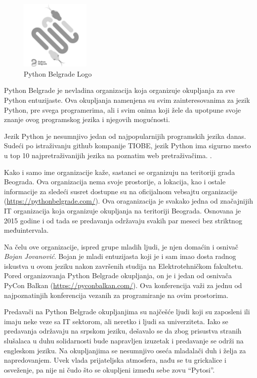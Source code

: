 \documentclass[a4paper]{article}
\begin{document}
{\begin{figure}[h!]
  \centering
  \includegraphics[width=0.3\textwidth]{pybgd.png}
  \caption{Python Belgrade Logo}
\end{figure}

Python Belgrade je nevladina organizacija koja organizuje okupljanja za sve Python entuzijaste. Ova okupljanja namenjena su svim
zainteresovanima za jezik Python, pre svega programerima, ali i svim onima koji žele da upotpune svoje znanje ovog programskog jezika i njegovih mogućnosti.

Jezik Python je nesumnjivo jedan od najpopularnijih programskih jezika danas. Sudeći po istraživanju github kompanije TIOBE, jezik Python ima sigurno mesto u top 10 najpretraživanijih jezika na poznatim web pretraživačima. \cite{pythonPopular}.

Kako i samo ime organizacije kaže, sastanci se organizuju na teritoriji grada Beograda. Ova organizacija nema svoje prostorije, a lokacija, kao i ostale informacije
za sledeći susret dostupne su na oficijalnom vebsajtu organizacije (\url{https://pythonbelgrade.com/}). Ova oraganizacija je svakako jedna od značajnijih IT organizacija koja organizuje okupljanja na teritoriji Beograda. Osnovana je 2015 godine i od tada se predavanja održavaju svakih par meseci bez striktnog međuintervala. 

Na čelu ove organizacije, ispred grupe mladih ljudi, je njen domaćin i osnivač \textit{Bojan Jovanović}. Bojan je mladi entuzijasta koji je i sam imao dosta radnog iskustva u ovom jeziku nakon završenih studija na
Elektrotehničkom fakultetu. Pored organizovanja Python Belgrade okupljanja, on je i jedan od osnivača PyCon Balkan (\url{https://pyconbalkan.com/}). Ova konferencija važi za jednu od najpoznatinjih konferencija vezanih za programiranje na ovim prostorima.

Predavači na Python Belgrade okupljanjima su najčešće ljudi koji su zaposleni ili imaju neke veze sa IT sektorom, ali neretko i ljudi sa univerziteta. \cite{pybgdSpeakers} Iako se predavanja održavaju na srpskom jeziku, dešavalo se da zbog prisustva stranih slušalaca u duhu solidarnosti bude napravljen izuzetak i predavanje se održi na engleskom jeziku. Na okupljanjima se nesumnjivo oseća mladalači duh i želja za napredovanjem. Uvek vlada prijateljska atmosfera, nađu se tu grickalice i osveženje, pa nije ni čudo što se okupljeni između sebe zovu ``Pytosi''.

}
\end{document}
